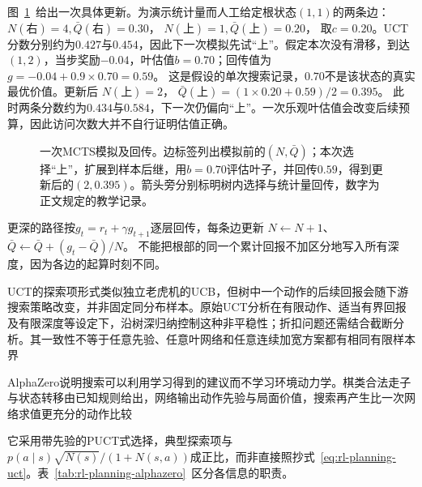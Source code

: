 图~\ref{fig:rl-planning-mcts}~给出一次具体更新。为演示统计量而人工给定根状态$(1,1)$的两条边：
$N(\text{右})=4,\bar Q(\text{右})=0.30$，
$N(\text{上})=1,\bar Q(\text{上})=0.20$，
取$c=0.20$。UCT分数分别约为$0.427$与$0.454$，因此下一次模拟先试“上”。假定本次没有滑移，到达$(1,2)$，当步奖励$-0.04$，叶估值$b=0.70$；回传值为
$g=-0.04+0.9\times0.70=0.59$。
这是假设的单次搜索记录，$0.70$不是该状态的真实最优价值。更新后
$N(\text{上})=2$，
$\bar Q(\text{上})=(1\times0.20+0.59)/2=0.395$。
此时两条分数约为$0.434$与$0.584$，下一次仍偏向“上”。一次乐观叶估值会改变后续预算，因此访问次数大并不自行证明估值正确。

\begin{figure}[htbp]
 \centering
 
 \caption{一次MCTS模拟及回传。边标签列出模拟前的$(N,\bar Q)$；本次选择“上”，扩展到样本后继，用$b=0.70$评估叶子，并回传$0.59$，得到更新后的$(2,0.395)$。箭头旁分别标明树内选择与统计量回传，数字为正文规定的教学记录。}
 \label{fig:rl-planning-mcts}
\end{figure}

更深的路径按$g_t=r_t+\gamma g_{t+1}$逐层回传，每条边更新
$N\leftarrow N+1$、
$\bar Q\leftarrow\bar Q+(g_t-\bar Q)/N$。
不能把根部的同一个累计回报不加区分地写入所有深度，因为各边的起算时刻不同。

UCT的探索项形式类似独立老虎机的UCB，但树中一个动作的后续回报会随下游搜索策略改变，并非固定同分布样本。原始UCT分析在有限动作、适当有界回报及有限深度等设定下，沿树深归纳控制这种非平稳性；折扣问题还需结合截断分析。其一致性不等于任意先验、任意叶网络和任意连续加宽方案都有相同有限样本界

AlphaZero说明搜索可以利用学习得到的建议而不学习环境动力学。棋类合法走子与状态转移由已知规则给出，网络输出动作先验与局面价值，搜索再产生比一次网络求值更充分的动作比较

它采用带先验的PUCT式选择，典型探索项与
$p(a\mid s)\sqrt{N(s)}/(1+N(s,a))$成正比，而非直接照抄式~\eqref{eq:rl-planning-uct}。表~\ref{tab:rl-planning-alphazero}~区分各信息的职责。

